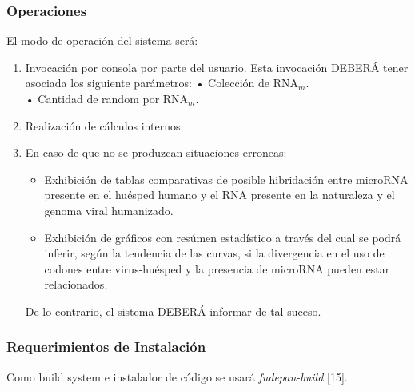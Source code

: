 \documentclass[12pt,a4paper,spanish]{article}
\begin{document}
	\subsubsection{Operaciones}
		El modo de operación del sistema será: 
		\begin{enumerate}
			\item Invocación por consola por parte del usuario. Esta invocación DEBERÁ tener asociada los siguiente parámetros: 
					\vskip 0.25cm
					\hspace*{0.75cm} • Colección de RNA$_m$. \\
					\hspace*{0.75cm} •  Cantidad de random por RNA$_m$. 
			\item Realización de cálculos internos.
			\item En caso de que no se produzcan situaciones erroneas: 
				\begin{itemize}
					\item Exhibición de tablas comparativas de posible hibridación entre microRNA presente en el huésped humano y el RNA presente en la 						  naturaleza y el genoma viral humanizado. %
					\item Exhibición de gráficos con resúmen estadístico a través del cual se podrá inferir, según la tendencia de las curvas, si la 							  divergencia en el uso de codones entre virus-huésped y la presencia de microRNA pueden estar relacionados.
				\end{itemize}
				De lo contrario, el sistema DEBERÁ informar de tal suceso.
		\end{enumerate}

	\subsubsection{Requerimientos de Instalación}
		Como build system e instalador de código se usará \textit{fudepan-build} [15].
\end{document}
